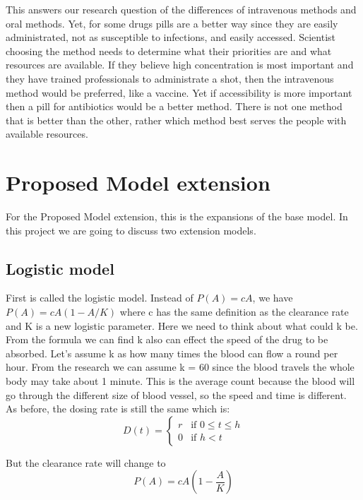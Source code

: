 \documentclass{article}
\begin{document}
This answers our research question of the differences of intravenous methods and oral methods. Yet, for some drugs pills are a better way since they are easily administrated, not as susceptible to infections, and easily accessed. Scientist choosing the method needs to determine what their priorities are and what resources are available. If they believe high concentration is most important and they have trained professionals to administrate a shot, then the intravenous method would be preferred, like a vaccine. Yet if accessibility is more important then a pill for antibiotics would be a better method. There is not one method that is better than the other, rather which method best serves the people with available resources. 

\section*{Proposed Model extension}
For the Proposed Model extension, this is the expansions of the base model. In this project we are going to discuss two extension models.
\subsection*{Logistic model}
First is called the logistic model. Instead of $P(A)=cA$, we have $P(A) = cA(1-A/K)$ where c has the same definition as the clearance rate and K is a new logistic parameter. Here we need to think about what could k be. From the formula we can find k also can effect the speed of the drug to be absorbed. Let's assume k as how many times the blood can flow a round per hour. From the research we can assume k = 60 since the blood travels the whole body may take about 1 minute. This is the average count because the blood will go through the different size of blood vessel, so the speed and time is different.\\

As before, the dosing rate is still the same which is:
\begin{equation}
  D(t) =
    \begin{cases}
      r & \text{if  $0 \leq t \leq h$}\\
      0 & \text{if $h< t$}
    \end{cases}       
\end{equation}

But the clearance rate will change to 
\begin{equation}
  P(A) = cA(1-\frac{A}{K})
\end{equation}
\end{document}
